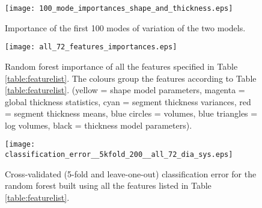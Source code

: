 \documentclass{llncs}
\begin{document}
		\begin{figure}[]
		\begin{center}
		
		\texttt{[image: 100\_mode\_importances\_shape\_and\_thickness.eps]}
	\caption{Importance of the first 100 modes of variation of the two models.}	
\label{fig:random_forest_feature_importance__100_shape_eigenvalues__and_100_thickness_modes_dia_sys}			\end{center}
		\end{figure}

	
		\begin{figure}[]
		\begin{center}
		
		\texttt{[image: all\_72\_features\_importances.eps]}
		
\caption{Random forest importance of all the features specified in Table \ref{table:featurelist}. The colours group the features according to Table \ref{table:featurelist}. (yellow = shape model parameters, magenta = global thickness statistics, cyan = segment thickness variances, red = segment thickness means, blue circles = volumes, blue triangles = log volumes, black = thickness model parameters).}
\label{fig:random_forest_feature_importance__all_72__dia_sys}		\end{center}
	\end{figure}
	
	\begin{figure}[]
	\begin{center}
	

		\texttt{[image: classification\_error\_\_5kfold\_200\_\_all\_72\_dia\_sys.eps]}
\caption{Cross-validated (5-fold and leave-one-out) classification error for the random forest built using all the features listed in Table \ref{table:featurelist}.}	
\label{fig:classification_error__5kfold_LOO__all_72_dia_sys}			\end{center}
		\end{figure}
		
\end{document}
